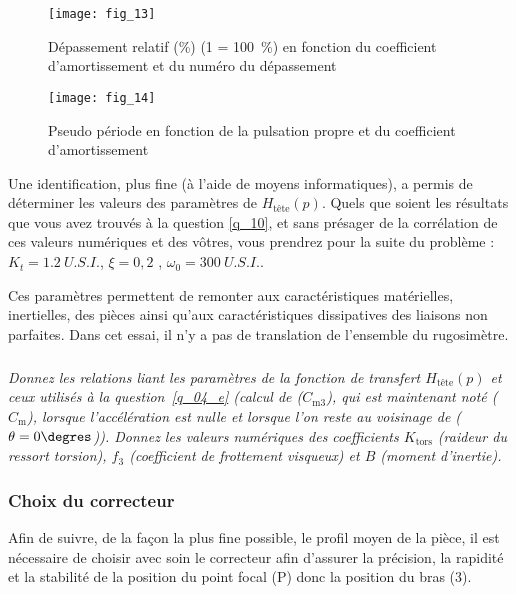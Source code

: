 \begin{minipage}[c]{.47\linewidth}
\begin{figure}[H]
\centering
\texttt{[image: fig\_13]}
\caption{\label{fig_13} Dépassement relatif (\%) (1 = 100~\%) en fonction
du coefficient d’amortissement et du numéro du dépassement}
\end{figure}
\end{minipage}\hfill
\begin{minipage}[c]{.47\linewidth}
\begin{figure}[H]
\centering
\texttt{[image: fig\_14]}
\caption{\label{fig_14} Pseudo période en fonction de la pulsation
propre et du coefficient d’amortissement}
\end{figure}
\end{minipage}

\vspace{.25cm}

Une identification, plus fine (à l’aide de moyens informatiques), a permis de déterminer les valeurs des
paramètres de $H_{\text{tête}}(p)$. Quels que soient les résultats que vous avez trouvés à la question \ref{q_10}, et sans
présager de la corrélation de ces valeurs numériques et des vôtres, vous prendrez pour la suite du
problème : $K_t =\SI{1,2}{U.S.I.}$, $\xi = 0,2$ , $\omega_0 = \SI{300}{U.S.I.}$.


Ces paramètres permettent de remonter aux caractéristiques matérielles, inertielles, des pièces ainsi qu’aux
caractéristiques dissipatives des liaisons non parfaites. Dans cet essai, il n’y a pas de translation de
l’ensemble du rugosimètre.


\subparagraph{\label{q_11}}\textit{Donnez les relations liant les paramètres de la fonction de transfert 
$H_{\text{tête}}(p)$ et ceux utilisés à la question~\ref{q_04_e} (calcul de ($C_{\text{m3}}$), qui est maintenant noté
($C_{\text{m}}$), lorsque l’accélération est nulle et lorsque l’on reste au voisinage de ($\theta=0\degres$)).
Donnez les valeurs numériques des coefficients $K_{\text{tors}}$ (raideur du ressort torsion), $f_3$ (coefficient de
frottement visqueux) et $B$ (moment d’inertie). }

\subsubsection{Choix du correcteur}

Afin de suivre, de la façon la plus fine possible, le profil moyen de la pièce, il est nécessaire de choisir
avec soin le correcteur afin d’assurer la précision, la rapidité et la stabilité de la position du point focal (P)
donc la position du bras (3).

